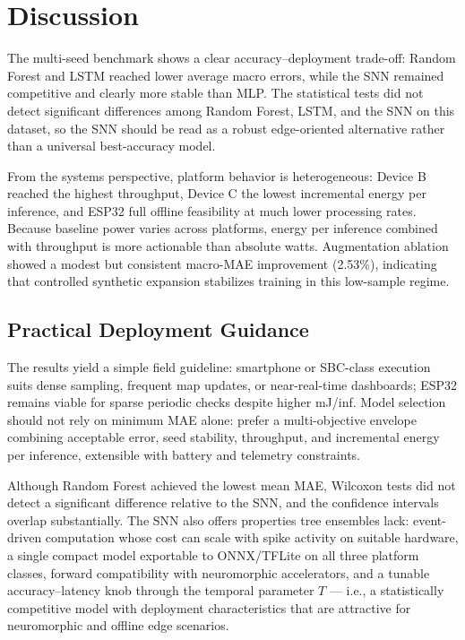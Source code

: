 \section{Discussion}

{\sloppy The multi-seed benchmark shows a clear accuracy--deployment trade-off: Random Forest and LSTM reached lower average macro errors, while the SNN remained competitive and clearly more stable than MLP. The statistical tests did not detect significant differences among Random Forest, LSTM, and the SNN on this dataset, so the SNN should be read as a robust edge-oriented alternative rather than a universal best-accuracy model.\par}
From the systems perspective, platform behavior is heterogeneous: Device B reached the highest throughput, Device C the lowest incremental energy per inference, and ESP32 full offline feasibility at much lower processing rates. Because baseline power varies across platforms, energy per inference combined with throughput is more actionable than absolute watts. Augmentation ablation showed a modest but consistent macro-MAE improvement (2.53\%), indicating that controlled synthetic expansion stabilizes training in this low-sample regime.

\subsection{Practical Deployment Guidance}
The results yield a simple field guideline: smartphone or SBC-class execution suits dense sampling, frequent map updates, or near-real-time dashboards; ESP32 remains viable for sparse periodic checks despite higher mJ/inf. Model selection should not rely on minimum MAE alone: prefer a multi-objective envelope combining acceptable error, seed stability, throughput, and incremental energy per inference, extensible with battery and telemetry constraints.

Although Random Forest achieved the lowest mean MAE, Wilcoxon tests did not detect a significant difference relative to the SNN, and the confidence intervals overlap substantially. The SNN also offers properties tree ensembles lack: event-driven computation whose cost can scale with spike activity on suitable hardware, a single compact model exportable to ONNX/TFLite on all three platform classes, forward compatibility with neuromorphic accelerators, and a tunable accuracy--latency knob through the temporal parameter $T$ --- i.e., a statistically competitive model with deployment characteristics that are attractive for neuromorphic and offline edge scenarios.

